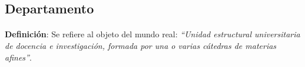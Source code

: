\subsection{Departamento}

  \paragraph{}\textbf{Definición}: Se refiere al objeto del mundo real:
  \emph{``Unidad estructural universitaria de docencia e investigación, formada
  por una o varias cátedras de materias afines''}.



